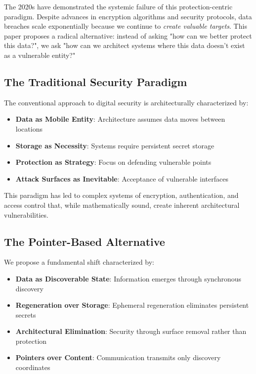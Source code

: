 \documentclass[11pt,a4paper]{article}
\begin{document}
The 2020s have demonstrated the systemic failure of this protection-centric paradigm. Despite advances in encryption algorithms and security protocols, data breaches scale exponentially because we continue to \emph{create valuable targets}. This paper proposes a radical alternative: instead of asking "how can we better protect this data?", we ask "how can we architect systems where this data doesn't exist as a vulnerable entity?"

\subsection{The Traditional Security Paradigm}

The conventional approach to digital security is architecturally characterized by:

\begin{itemize}
    \item \textbf{Data as Mobile Entity}: Architecture assumes data moves between locations
    \item \textbf{Storage as Necessity}: Systems require persistent secret storage
    \item \textbf{Protection as Strategy}: Focus on defending vulnerable points
    \item \textbf{Attack Surfaces as Inevitable}: Acceptance of vulnerable interfaces
\end{itemize}

This paradigm has led to complex systems of encryption, authentication, and access control that, while mathematically sound, create inherent architectural vulnerabilities.

\subsection{The Pointer-Based Alternative}

We propose a fundamental shift characterized by:

\begin{itemize}
    \item \textbf{Data as Discoverable State}: Information emerges through synchronous discovery
    \item \textbf{Regeneration over Storage}: Ephemeral regeneration eliminates persistent secrets
    \item \textbf{Architectural Elimination}: Security through surface removal rather than protection
    \item \textbf{Pointers over Content}: Communication transmits only discovery coordinates
\end{itemize}
\end{document}
